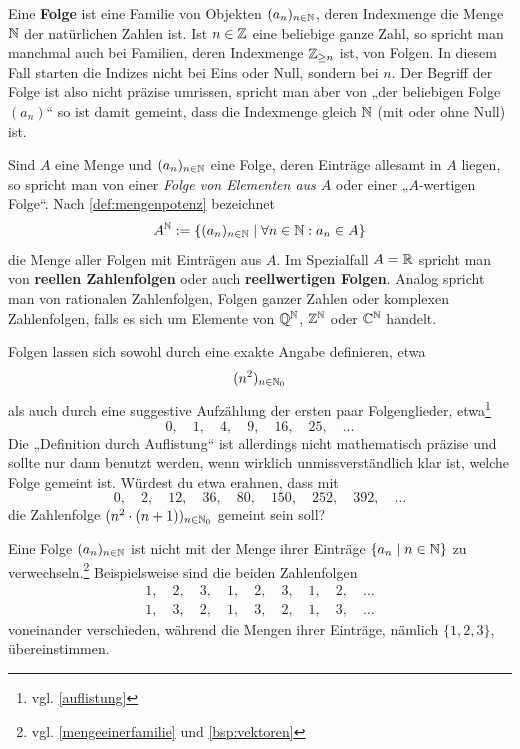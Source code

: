 \begin{defin}[Folge] \label{def:folge} 
    Eine \textbf{Folge} ist eine Familie von Objekten $(a_n)_{n\in \mathbb N}$, deren Indexmenge die Menge $\mathbb N$ der natürlichen Zahlen ist. Ist $n\in \mathbb Z$ eine beliebige ganze Zahl, so spricht man manchmal auch bei Familien, deren Indexmenge $\mathbb Z_{\ge n}$ ist, von Folgen. In diesem Fall starten die Indizes nicht bei Eins oder Null, sondern bei $n$. Der Begriff der Folge ist also nicht präzise umrissen, spricht man aber von „der beliebigen Folge $(a_n)$“ so ist damit gemeint, dass die Indexmenge gleich $\mathbb N$ (mit oder ohne Null) ist.
    
    Sind $A$ eine Menge und $(a_n)_{n\in \mathbb N}$ eine Folge, deren Einträge allesamt in $A$ liegen, so spricht man von einer \emph{Folge von Elementen aus $A$} oder einer „$A$-wertigen Folge“. Nach \cref{def:mengenpotenz} bezeichnet
    \[ A^\mathbb N := \{ (a_n)_{n\in \mathbb N} \mid \forall n\in \mathbb N: a_n\in A \} \]
    die Menge aller Folgen mit Einträgen aus $A$. Im Spezialfall $A=\mathbb R$ spricht man von \textbf{reellen Zahlenfolgen} oder auch \textbf{reellwertigen Folgen}. Analog spricht man von rationalen Zahlenfolgen, Folgen ganzer Zahlen oder komplexen Zahlenfolgen, falls es sich um Elemente von $\mathbb Q^\mathbb N$, $\mathbb Z^\mathbb N$ oder $\mathbb C^\mathbb N$ handelt.
\end{defin}


\begin{nota}
    Folgen lassen sich sowohl durch eine exakte Angabe definieren, etwa
    \begin{align*}
        (n^2)_{n\in \mathbb N_0}
    \end{align*}
    als auch durch eine suggestive Aufzählung der ersten paar Folgenglieder, etwa\footnote{vgl. \cref{auflistung}}
        \[ 0,\quad 1,\quad 4,\quad 9,\quad 16,\quad 25,\quad\dots \]
    Die „Definition durch Auflistung“ ist allerdings nicht mathematisch präzise und sollte nur dann benutzt werden, wenn wirklich unmissverständlich klar ist, welche Folge gemeint ist. Würdest du etwa erahnen, dass mit
        \[ 0,\quad 2,\quad 12,\quad 36,\quad 80,\quad 150,\quad 252,\quad 392,\quad \dots\]
    die Zahlenfolge $(n^2\cdot (n+1))_{n\in \mathbb N_0}$ gemeint sein soll?
\end{nota}


\begin{bem}
    Eine Folge $(a_n)_{n\in \mathbb N}$ ist nicht mit der Menge ihrer Einträge $\{a_n\mid n\in \mathbb N\}$ zu verwechseln.\footnote{vgl. \cref{mengeeinerfamilie} und \cref{bsp:vektoren}} Beispielsweise sind die beiden Zahlenfolgen
    \begin{align*}
        1,\quad 2,\quad 3,\quad 1,\quad 2,\quad 3,\quad 1,\quad 2,\quad \dots \\
        1,\quad 3,\quad 2,\quad 1,\quad 3,\quad 2,\quad 1,\quad 3,\quad \dots
    \end{align*}
    voneinander verschieden, während die Mengen ihrer Einträge, nämlich $\{1,2,3\}$, übereinstimmen.
\end{bem}


